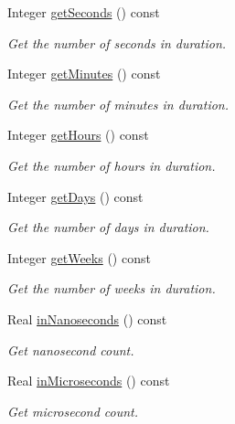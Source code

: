 \begin{DoxyCompactItemize}
Integer \hyperlink{classlibrary_1_1physics_1_1time_1_1_duration_a98388bab81d1d5550532fdedaa08635c}{get\+Seconds} () const
\begin{DoxyCompactList}\small\item\em Get the number of seconds in duration. \end{DoxyCompactList}\item 
Integer \hyperlink{classlibrary_1_1physics_1_1time_1_1_duration_a2c8a5767f1a0add4999c649001cdb838}{get\+Minutes} () const
\begin{DoxyCompactList}\small\item\em Get the number of minutes in duration. \end{DoxyCompactList}\item 
Integer \hyperlink{classlibrary_1_1physics_1_1time_1_1_duration_a05ef46de76556cd571fd8a218dc3b24f}{get\+Hours} () const
\begin{DoxyCompactList}\small\item\em Get the number of hours in duration. \end{DoxyCompactList}\item 
Integer \hyperlink{classlibrary_1_1physics_1_1time_1_1_duration_a06ffb87b3c946a64a69000784488ab5c}{get\+Days} () const
\begin{DoxyCompactList}\small\item\em Get the number of days in duration. \end{DoxyCompactList}\item 
Integer \hyperlink{classlibrary_1_1physics_1_1time_1_1_duration_a11cf17341b43110b443ffd150571f43c}{get\+Weeks} () const
\begin{DoxyCompactList}\small\item\em Get the number of weeks in duration. \end{DoxyCompactList}\item 
Real \hyperlink{classlibrary_1_1physics_1_1time_1_1_duration_a45aa358d61481356dd591290d6ab3691}{in\+Nanoseconds} () const
\begin{DoxyCompactList}\small\item\em Get nanosecond count. \end{DoxyCompactList}\item 
Real \hyperlink{classlibrary_1_1physics_1_1time_1_1_duration_a69c9501a4432aac49cecd9d47da7c4f6}{in\+Microseconds} () const
\begin{DoxyCompactList}\small\item\em Get microsecond count. \end{DoxyCompactList}\item 

\end{DoxyCompactItemize}
